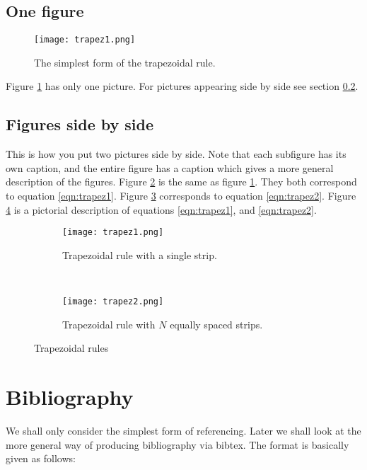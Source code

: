 \documentclass[12pt,a4paper]{article}
\begin{document}
\subsection{One figure}
\begin{figure}[h!]
\centering
\texttt{[image: trapez1.png]}
\caption{The simplest form of the trapezoidal rule.}
\label{fig:simple_trapez}
\end{figure}
Figure \ref{fig:simple_trapez} has only one picture. For pictures appearing side by side see section \ref{subfigures}.

\subsection{Figures side by side}\label{subfigures}
This is how you put two pictures side by side. Note that each subfigure has its own caption, and the entire figure has a caption which gives a more general description of the figures. Figure \ref{fig:trapez1} is the same as figure \ref{fig:simple_trapez}. They both correspond to equation \eqref{eqn:trapez1}. Figure \ref{fig:trapez2} corresponds to equation \eqref{eqn:trapez2}. Figure \ref{fig:trapez} is a pictorial description of equations \eqref{eqn:trapez1}, and \eqref{eqn:trapez2}.
\begin{figure}
    \centering
    \begin{subfigure}[b]{0.4\textwidth}
        \texttt{[image: trapez1.png]}
        \caption{Trapezoidal rule with a single strip.}
        \label{fig:trapez1}
    \end{subfigure}
    ~ %
    \begin{subfigure}[b]{0.4\textwidth}
        \texttt{[image: trapez2.png]}
        \caption{Trapezoidal rule with $N$ equally spaced strips.}
        \label{fig:trapez2}
    \end{subfigure}
    \caption{Trapezoidal rules}\label{fig:trapez}
\end{figure}

\newpage
\section{Bibliography}
We shall only consider the simplest form of referencing. Later we shall look at the more general way of producing bibliography via bibtex. The format is basically given as follows:
\end{document}
